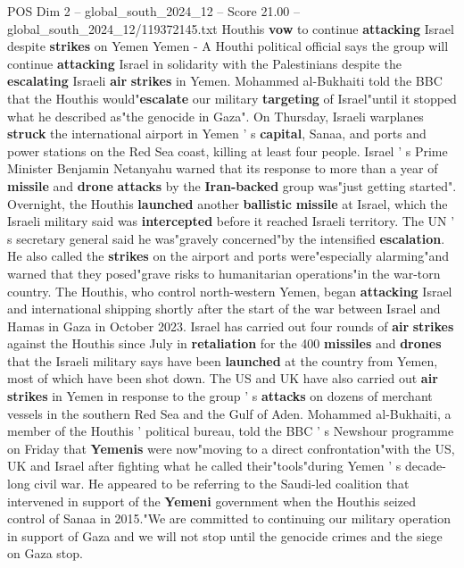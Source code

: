 \begin{textsample}{POS Dim 2 – global\_south\_2024\_12 – Score 21.00 – global\_south\_2024\_12/119372145.txt}  \label{ex:f2_pos_205}
Houthis \textbf{vow} to continue \textbf{attacking} Israel despite \textbf{strikes} on Yemen Yemen - A Houthi political official says the group will continue \textbf{attacking} Israel in solidarity with the Palestinians despite the \textbf{escalating} Israeli \textbf{air} \textbf{strikes} in Yemen.
Mohammed al-Bukhaiti told the BBC that the Houthis would"\textbf{escalate} our military \textbf{targeting} of Israel"until it stopped what he described as"the genocide in Gaza".
On Thursday, Israeli warplanes \textbf{struck} the international airport in Yemen ' s \textbf{capital}, Sanaa, and ports and power stations on the Red Sea coast, killing at least four people.
Israel ' s Prime Minister Benjamin Netanyahu warned that its response to more than a year of \textbf{missile} and \textbf{drone} \textbf{attacks} by the \textbf{Iran-backed} group was"just getting started".
Overnight, the Houthis \textbf{launched} another \textbf{ballistic} \textbf{missile} at Israel, which the Israeli military said was \textbf{intercepted} before it reached Israeli territory.
The UN ' s secretary general said he was"gravely concerned"by the intensified \textbf{escalation}.
He also called the \textbf{strikes} on the airport and ports were"especially alarming"and warned that they posed"grave risks to humanitarian operations"in the war-torn country.
The Houthis, who control north-western Yemen, began \textbf{attacking} Israel and international shipping shortly after the start of the war between Israel and Hamas in Gaza in October 2023.
Israel has carried out four rounds of \textbf{air} \textbf{strikes} against the Houthis since July in \textbf{retaliation} for the 400 \textbf{missiles} and \textbf{drones} that the Israeli military says have been \textbf{launched} at the country from Yemen, most of which have been shot down.
The US and UK have also carried out \textbf{air} \textbf{strikes} in Yemen in response to the group ' s \textbf{attacks} on dozens of merchant vessels in the southern Red Sea and the Gulf of Aden.
Mohammed al-Bukhaiti, a member of the Houthis ' political bureau, told the BBC ' s Newshour programme on Friday that \textbf{Yemenis} were now"moving to a direct confrontation"with the US, UK and Israel after fighting what he called their"tools"during Yemen ' s decade-long civil war.
He appeared to be referring to the Saudi-led coalition that intervened in support of the \textbf{Yemeni} government when the Houthis seized control of Sanaa in 2015."We are committed to continuing our military operation in support of Gaza and we will not stop until the genocide crimes and the siege on Gaza stop.

\end{textsample}

